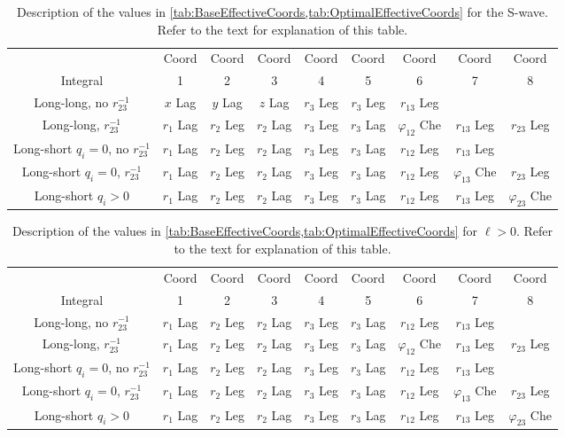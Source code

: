 \documentclass[Dissertation.tex]{subfiles}
\begin{document}
\begin{table}
\centering
\footnotesize
\begin{tabular}{c c c c c c c c c}
\toprule
 & Coord & Coord & Coord & Coord & Coord & Coord & Coord & Coord \\
Integral & 1 & 2 & 3 & 4 & 5 & 6 & 7 & 8 \\
\midrule
 Long-long, no $r_{23}^{-1}$ & $x$ Lag & $y$ Lag & $z$ Lag & $r_3$ Leg & $r_3$ Leg & $r_{13}$ Leg & & \\
 Long-long, $r_{23}^{-1}$ & $r_1$ Lag & $r_2$ Leg & $r_2$ Lag & $r_3$ Leg & $r_3$ Lag & $\varphi_{12}$ Che & $r_{13}$ Leg & $r_{23}$ Leg \\
\midrule
 Long-short $q_i = 0$, no $r_{23}^{-1}$ & $r_1$ Lag & $r_2$ Leg & $r_2$ Lag & $r_3$ Leg & $r_3$ Lag & $r_{12}$ Leg & $r_{13}$ Leg & \\
 Long-short $q_i = 0$, $r_{23}^{-1}$ & $r_1$ Lag & $r_2$ Leg & $r_2$ Lag & $r_3$ Leg & $r_3$ Lag & $r_{12}$ Leg & $\varphi_{13}$ Che & $r_{23}$ Leg \\
 Long-short $q_i > 0$ & $r_1$ Lag & $r_2$ Leg & $r_2$ Lag & $r_3$ Leg & $r_3$ Lag & $r_{12}$ Leg & $r_{13}$ Leg & $\varphi_{23}$ Che \\
\bottomrule
\end{tabular}
\caption{Description of the values in \cref{tab:BaseEffectiveCoords,tab:OptimalEffectiveCoords} for the S-wave. Refer to the text for explanation of this table.}
\label{tab:EffectiveCoords1}
\end{table}

\begin{table}
\centering
\footnotesize
\begin{tabular}{c c c c c c c c c}
\toprule
 & Coord & Coord & Coord & Coord & Coord & Coord & Coord & Coord \\
Integral & 1 & 2 & 3 & 4 & 5 & 6 & 7 & 8 \\
\midrule
 Long-long, no $r_{23}^{-1}$ & $r_1$ Lag & $r_2$ Leg & $r_2$ Lag & $r_3$ Leg & $r_3$ Lag & $r_{12}$ Leg & $r_{13}$ Leg & \\
 Long-long, $r_{23}^{-1}$ & $r_1$ Lag & $r_2$ Leg & $r_2$ Lag & $r_3$ Leg & $r_3$ Lag & $\varphi_{12}$ Che & $r_{13}$ Leg & $r_{23}$ Leg \\
\midrule
 Long-short $q_i = 0$, no $r_{23}^{-1}$ & $r_1$ Lag & $r_2$ Leg & $r_2$ Lag & $r_3$ Leg & $r_3$ Lag & $r_{12}$ Leg & $r_{13}$ Leg & \\
 Long-short $q_i = 0$, $r_{23}^{-1}$ & $r_1$ Lag & $r_2$ Leg & $r_2$ Lag & $r_3$ Leg & $r_3$ Lag & $r_{12}$ Leg & $\varphi_{13}$ Che & $r_{23}$ Leg \\
 Long-short $q_i > 0$ & $r_1$ Lag & $r_2$ Leg & $r_2$ Lag & $r_3$ Leg & $r_3$ Lag & $r_{12}$ Leg & $r_{13}$ Leg & $\varphi_{23}$ Che \\
\bottomrule
\end{tabular}
\caption{Description of the values in \cref{tab:BaseEffectiveCoords,tab:OptimalEffectiveCoords} for $\ell > 0$. Refer to the text for explanation of this table.}
\label{tab:EffectiveCoords2}
\end{table}
\end{document}
